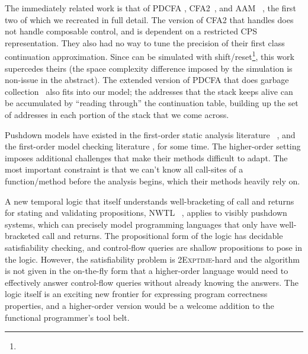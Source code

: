 The immediately related work is that of PDCFA \citep{ianjohnson:earl2010pdcfa}, CFA2~\citep{ianjohnson:vardoulakis-lmcs11, ianjohnson:Vardoulakis2011Pushdown}, and AAM ~\citep{dvanhorn:VanHorn2010Abstracting}, the first two of which we recreated in full detail.
%
The version of CFA2 that handles  does not handle composable control, and is dependent on a restricted CPS representation.
%
They also had no way to tune the precision of their first class continuation approximation.
%
Since  can be simulated with shift/reset\footnote{\RktPn{(}\mbox{}\RktPn{(}\mbox{}\RktPn{)}\mbox{}\RktPn{(}\mbox{}\mbox{}\RktPn{(}\mbox{}\RktPn{(}\mbox{}\RktPn{(}\RktSym{$\lambda$}\mbox{}\RktPn{(}\RktPn{)}\mbox{}\RktPn{(}\mbox{}\mbox{}\RktPn{(}\mbox{}\RktPn{)}\RktPn{)}\RktPn{)}\RktPn{)}\RktPn{)}\RktPn{)}\RktPn{)}}, this work supercedes theirs (the space complexity difference imposed by the simulation is non-issue in the abstract).
%
The extended version of PDCFA that does garbage collection~\citep{dvanhorn:Earl2012Introspective} also fits into our model;
the addresses that the stack keeps alive can be accumulated by ``reading through'' the continuation table, building up the set of addresses in each portion of the stack that we come across.

Pushdown models have existed in the first-order static analysis literature ~\citep[Chapter 7]{local:muchnick:jones:flow-analysis:1981}\citep{ianjohnson:reps:pushdown:1995}, and the first-order model checking literature \citep{ianjohnson:bouajiani:esparza:pushdown:1997}, for some time.
%
The higher-order setting imposes additional challenges that make their methods difficult to adapt.
%
The most important constraint is that we can't know all call-sites of a function/method before the analysis begins, which their methods heavily rely on.

A new temporal logic that itself understands well-bracketing of call and returns for stating and validating propositions, NWTL ~\citep{ianjohnson:alur:nwtl:2007}, applies to visibly pushdown systems, which can precisely model programming languages that only have well-bracketed call and returns.
%
The propositional form of the logic has decidable satisfiability checking, and control-flow queries are shallow propositions to pose in the logic.
%
However, the satisfiability problem is \textsc{2Exptime}-hard and the algorithm is not given in the on-the-fly form that a higher-order language would need to effectively answer control-flow queries without already knowing the answers.
%
The logic itself is an exciting new frontier for expressing program correctness properties, and a higher-order version would be a welcome addition to the functional programmer's tool belt.

